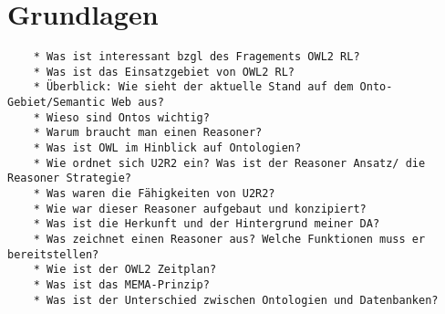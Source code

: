 \chapter{Grundlagen}

\begin{verbatim}
    * Was ist interessant bzgl des Fragements OWL2 RL?
    * Was ist das Einsatzgebiet von OWL2 RL?
    * Überblick: Wie sieht der aktuelle Stand auf dem Onto-Gebiet/Semantic Web aus?
    * Wieso sind Ontos wichtig?
    * Warum braucht man einen Reasoner?
    * Was ist OWL im Hinblick auf Ontologien?
    * Wie ordnet sich U2R2 ein? Was ist der Reasoner Ansatz/ die Reasoner Strategie?
    * Was waren die Fähigkeiten von U2R2?
    * Wie war dieser Reasoner aufgebaut und konzipiert?
    * Was ist die Herkunft und der Hintergrund meiner DA?
    * Was zeichnet einen Reasoner aus? Welche Funktionen muss er bereitstellen?
    * Wie ist der OWL2 Zeitplan?
    * Was ist das MEMA-Prinzip?
    * Was ist der Unterschied zwischen Ontologien und Datenbanken? 
\end{verbatim}
